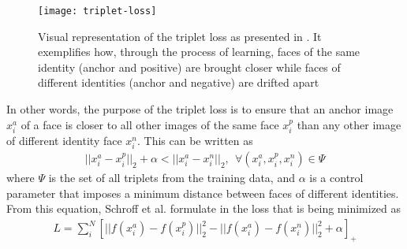 \begin{figure}[h]
	\begin{center}
		\texttt{[image: triplet-loss]}
		\caption[Triplet loss visualisation]{Visual representation of the triplet loss as presented in \cite{SchroffKP15}. It exemplifies how, through the process of learning, faces of the same identity (anchor and positive) are brought closer while faces of different identities (anchor and negative) are drifted apart }
	\end{center}
\end{figure}

In other words, the purpose of the triplet loss is to ensure that an anchor image $x_{i}^{a}$ of a face is closer to all other images of the same face $x_{i}^{p}$ than any other image of different identity face $x_{i}^{n}$. This can be written as
\begin{align}
	||x_{i}^{a}  - x_{i}^{p} ||_{2} + \alpha < ||x_{i}^{a}  - x_{i}^{n} ||_{2}, \ \ \forall (x_{i}^{a}, x_{i}^{p}, x_{i}^{n}) \in \Psi
\end{align} where $\Psi$ is the set of all triplets from the training data, and $\alpha$ is a control parameter that imposes a minimum distance between faces of different identities. From this equation, Schroff et al. formulate in \cite{SchroffKP15} the loss that is being minimized as 
\begin{align}
L = \sum_{i}^{N} [||f(x_{i}^{a}) - f(x_{i}^{p})||_{2}^{2} - ||f(x_i^a) - f(x_i^n)||_{2}^{2} + \alpha]_{+}
\end{align}

